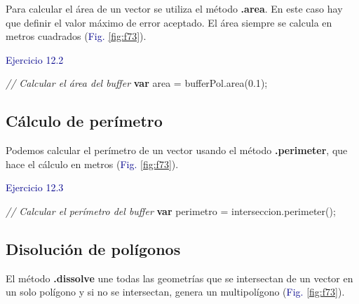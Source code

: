\documentclass[
  12pt,
  letterpaper,
  twoside]{book}
\newenvironment{Shaded}{\begin{snugshade}}{\end{snugshade}}
\newcommand{\CommentTok}[1]{\textcolor[rgb]{0.24,0.58,0.00}{\textit{#1}}}
\newcommand{\FloatTok}[1]{\textcolor[rgb]{0.28,0.53,0.93}{#1}}
\newcommand{\FunctionTok}[1]{\textcolor[rgb]{0.48,0.12,0.64}{#1}}
\newcommand{\KeywordTok}[1]{\textcolor[rgb]{0.00,0.00,0.00}{\textbf{#1}}}
\newcommand{\NormalTok}[1]{#1}
\newcommand{\OperatorTok}[1]{\textcolor[rgb]{0.00,0.00,0.00}{#1}}
\newcommand\boldpurple[1]{\textcolor{darkpurple}{\textbf{#1}}}
\begin{document}
Para calcular el área de un vector se utiliza el método \boldpurple{.area}. En este caso hay que definir el valor máximo de error aceptado. El área siempre se calcula en metros cuadrados (\textcolor{darkblue}{Fig.} \ref{fig:f73}).

\textcolor{darkblue}{Ejercicio 12.2}

\begin{Shaded}
\begin{Highlighting}[]
\CommentTok{// Calcular el área del buffer}
\KeywordTok{var}\NormalTok{ area }\OperatorTok{=}\NormalTok{ bufferPol}\OperatorTok{.}\FunctionTok{area}\NormalTok{(}\FloatTok{0.1}\NormalTok{)}\OperatorTok{;}
\end{Highlighting}
\end{Shaded}

\hypertarget{cuxe1lculo-de-peruxedmetro}{%
\subsection*{Cálculo de perímetro}\label{cuxe1lculo-de-peruxedmetro}}

Podemos calcular el perímetro de un vector usando el método \boldpurple{.perimeter}, que hace el cálculo en metros (\textcolor{darkblue}{Fig.} \ref{fig:f73}).

\textcolor{darkblue}{Ejercicio 12.3}

\begin{Shaded}
\begin{Highlighting}[]
\CommentTok{// Calcular el perímetro del buffer}
\KeywordTok{var}\NormalTok{ perimetro }\OperatorTok{=}\NormalTok{ interseccion}\OperatorTok{.}\FunctionTok{perimeter}\NormalTok{()}\OperatorTok{;}
\end{Highlighting}
\end{Shaded}

\hypertarget{disoluciuxf3n-de-poluxedgonos}{%
\subsection*{Disolución de polígonos}\label{disoluciuxf3n-de-poluxedgonos}}

El método \boldpurple{.dissolve} une todas las geometrías que se intersectan de un vector en un solo polígono y si no se intersectan, genera un multipolígono (\textcolor{darkblue}{Fig.} \ref{fig:f73}).
\end{document}
